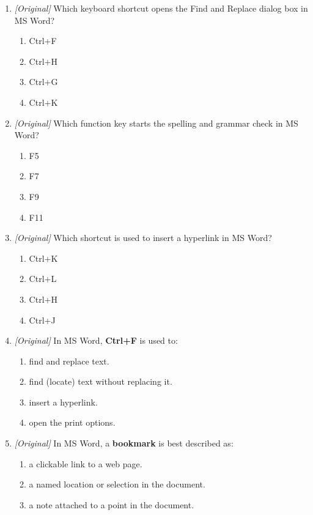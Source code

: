\begin{enumerate}[label=\textbf{Q\arabic*.}, leftmargin=*]
\item \textit{[Original]} Which keyboard shortcut opens the Find and Replace
  dialog box in MS Word?
  \begin{enumerate}[label=\Alph*.]
    \item Ctrl+F
    \item Ctrl+H
    \item Ctrl+G
    \item Ctrl+K
  \end{enumerate}
\item \textit{[Original]} Which function key starts the spelling and grammar
  check in MS Word?
  \begin{enumerate}[label=\Alph*.]
    \item F5
    \item F7
    \item F9
    \item F11
  \end{enumerate}
\item \textit{[Original]} Which shortcut is used to insert a hyperlink in
  MS Word?
  \begin{enumerate}[label=\Alph*.]
    \item Ctrl+K
    \item Ctrl+L
    \item Ctrl+H
    \item Ctrl+J
  \end{enumerate}
\item \textit{[Original]} In MS Word, \textbf{Ctrl+F} is used to:
  \begin{enumerate}[label=\Alph*.]
    \item find and replace text.
    \item find (locate) text without replacing it.
    \item insert a hyperlink.
    \item open the print options.
  \end{enumerate}
\item \textit{[Original]} In MS Word, a \textbf{bookmark} is best described as:
  \begin{enumerate}[label=\Alph*.]
    \item a clickable link to a web page.
    \item a named location or selection in the document.
    \item a note attached to a point in the document.

\end{enumerate}
\end{enumerate}
